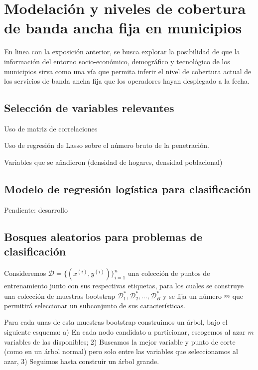 \documentclass[9pt,twocolumn,twoside]{ilcss}
\begin{document}

\section{Modelación y niveles de cobertura de banda ancha fija en municipios}

En linea con la exposición anterior, se busca explorar la posibilidad de que la información del entorno socio-económico, demográfico y tecnológico de los municipios sirva como una vía que permita inferir el nivel de cobertura actual de los servicios de banda ancha fija que los operadores hayan desplegado a la fecha.



\subsection*{Selección de variables relevantes}

Uso de matriz de correlaciones

Uso de regresión de Lasso sobre el número bruto de la penetración.

Variables que se añadieron (densidad de hogares, densidad poblacional)

\subsection{Modelo de regresión logística para clasificación}

Pendiente: desarrollo

\subsection{Bosques aleatorios para problemas de clasificación}

Consideremos ${\mathcal D} =\{(x^{(i)}, y^{(i)})\}_{i=1}^n$ una colección de puntos de entrenamiento junto con sus respectivas etiquetas, para los cuales se construye una colección de muestras bootstrap ${\mathcal D}_1^*, {\mathcal D}_2^*, \ldots, {\mathcal D}_B^*$ y se fija un número $m$ que permitirá seleccionar un subconjunto de sus características.

Para cada unas de esta muestras bootstrap construimos un árbol, bajo el siguiente esquema: a)
En cada nodo candidato a particionar, escogemos al azar $m$ variables de las disponibles; 2) Buscamos la mejor variable y punto de corte (como en un árbol normal) pero solo entre las variables que seleccionamos al azar, 3) Seguimos hasta construir un árbol grande.
\end{document}
